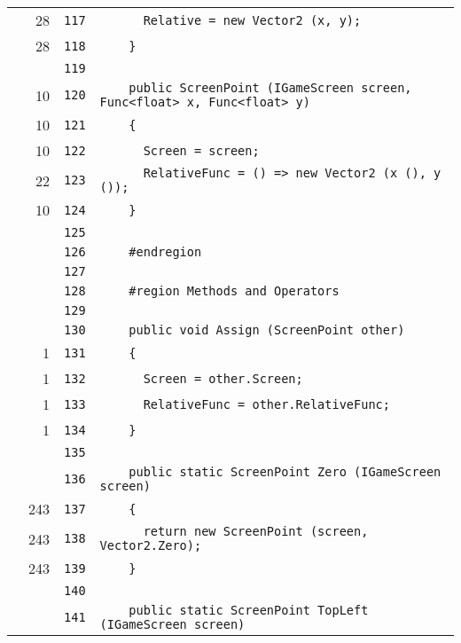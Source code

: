 \documentclass[a4paper,10pt]{article}
\begin{document}
\begin{longtable}[l]{lrrl}
\cellcolor{green} & 28 & \verb~117~ & \verb~      Relative = new Vector2 (x, y);~\\
\cellcolor{green} & 28 & \verb~118~ & \verb~    }~\\
\cellcolor{gray} &  & \verb~119~ & \verb~~\\
\cellcolor{green} & 10 & \verb~120~ & \verb~    public ScreenPoint (IGameScreen screen, Func<float> x, Func<float> y)~\\
\cellcolor{green} & 10 & \verb~121~ & \verb~    {~\\
\cellcolor{green} & 10 & \verb~122~ & \verb~      Screen = screen;~\\
\cellcolor{green} & 22 & \verb~123~ & \verb~      RelativeFunc = () => new Vector2 (x (), y ());~\\
\cellcolor{green} & 10 & \verb~124~ & \verb~    }~\\
\cellcolor{gray} &  & \verb~125~ & \verb~~\\
\cellcolor{gray} &  & \verb~126~ & \verb~    #endregion~\\
\cellcolor{gray} &  & \verb~127~ & \verb~~\\
\cellcolor{gray} &  & \verb~128~ & \verb~    #region Methods and Operators~\\
\cellcolor{gray} &  & \verb~129~ & \verb~~\\
\cellcolor{gray} &  & \verb~130~ & \verb~    public void Assign (ScreenPoint other)~\\
\cellcolor{green} & 1 & \verb~131~ & \verb~    {~\\
\cellcolor{green} & 1 & \verb~132~ & \verb~      Screen = other.Screen;~\\
\cellcolor{green} & 1 & \verb~133~ & \verb~      RelativeFunc = other.RelativeFunc;~\\
\cellcolor{green} & 1 & \verb~134~ & \verb~    }~\\
\cellcolor{gray} &  & \verb~135~ & \verb~~\\
\cellcolor{gray} &  & \verb~136~ & \verb~    public static ScreenPoint Zero (IGameScreen screen)~\\
\cellcolor{green} & 243 & \verb~137~ & \verb~    {~\\
\cellcolor{green} & 243 & \verb~138~ & \verb~      return new ScreenPoint (screen, Vector2.Zero);~\\
\cellcolor{green} & 243 & \verb~139~ & \verb~    }~\\
\cellcolor{gray} &  & \verb~140~ & \verb~~\\
\cellcolor{gray} &  & \verb~141~ & \verb~    public static ScreenPoint TopLeft (IGameScreen screen)~\\

\end{longtable}
\end{document}
